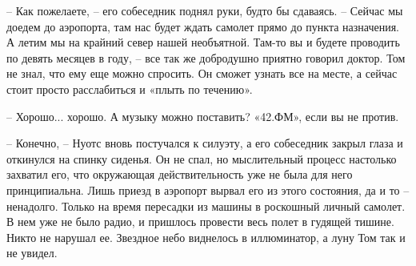 – Как пожелаете, – его собеседник поднял руки, будто бы сдаваясь. – Сейчас мы доедем до аэропорта, там нас будет ждать самолет прямо до пункта назначения. А летим мы на крайний север нашей необъятной. Там-то вы и будете проводить по девять месяцев в году, – все так же добродушно приятно говорил доктор. Том не знал, что ему еще можно спросить. Он сможет узнать все на месте, а сейчас стоит просто расслабиться и «плыть по течению».

– Хорошо... хорошо. А музыку можно поставить? «42.ФМ», если вы не против. 

– Конечно, – Нуотс вновь постучался к силуэту, а его собеседник закрыл глаза и откинулся на спинку сиденья. Он не спал, но мыслительный процесс настолько захватил его, что окружающая действительность уже не была для него принципиальна. Лишь приезд в аэропорт вырвал его из этого состояния, да и то – ненадолго. Только на время пересадки из машины в роскошный личный самолет. В нем уже не было радио, и пришлось провести весь полет в гудящей тишине. Никто не нарушал ее. Звездное небо виднелось в иллюминатор, а луну Том так и не увидел. 
\clearpage
{\begingroup
{}
\noindent
\endgroup}
\cleardoublepage
